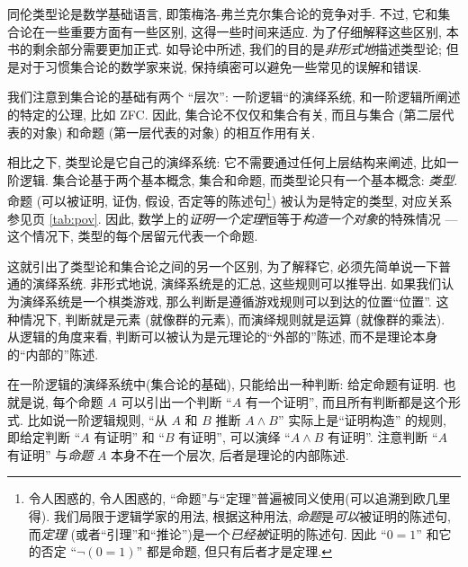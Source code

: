 \label{sec:axioms}

同伦类型论是数学基础语言, 即策梅洛-弗兰克尔集合论的竞争对手. 不过, 它和集合论在一些重要方面有一些区别, 这得一些时间来适应. 为了仔细解释这些区别, 本书的剩余部分需要更加正式. 如导论中所述, 我们的目的是\emph{非形式地}描述类型论; 但是对于习惯集合论的数学家来说, 保持缜密可以避免一些常见的误解和错误.

我们注意到集合论的基础有两个 ``层次'': 一阶逻辑``的演绎系统, 和一阶逻辑所阐述的特定的公理, 比如 ZFC. 因此, 集合论不仅仅和集合有关, 而且与集合 (第二层代表的对象) 和命题 (第一层代表的对象) 的相互作用有关.

相比之下, 类型论是它自己的演绎系统: 它不需要通过任何上层结构来阐述, 比如一阶逻辑. 集合论基于两个基本概念, 集合和命题, 而类型论只有一个基本概念: \emph{类型}. 命题 (可以被证明, 证伪, 假设, 否定等的陈述句\footnote{令人困惑的, 令人困惑的, ``命题''与``定理''普遍被同义使用(可以追溯到欧几里得). 我们局限于逻辑学家的用法, 根据这种用法, \emph{命题}是\emph{可以}被证明的陈述句, 而\emph{定理} (或者``引理''和``推论'')是一个\emph{已经被}证明的陈述句. 因此 ``$0=1$'' 和它的否定 ``$\neg(0=1)$'' 都是命题, 但只有后者才是定理.}) 被认为是特定的类型, 对应关系参见\pageref{tab:pov}页 \cref{tab:pov}. 因此, 数学上的\emph{证明一个定理}恒等于\emph{构造一个对象}的特殊情况 --- 这个情况下, 类型的每个居留元代表一个命题.

%
这就引出了类型论和集合论之间的另一个区别, 为了解释它, 必须先简单说一下普通的演绎系统. 非形式地说, 演绎系统是的汇总,%
这些规则可以推导出. %
如果我们认为演绎系统是一个棋类游戏, %
那么判断是遵循游戏规则可以到达的位置``位置''. 这种情况下, 判断就是元素 (就像群的元素), 而演绎规则就是运算 (就像群的乘法). 从逻辑的角度来看, 判断可以被认为是元理论的``外部的''陈述, 而不是理论本身的``内部的''陈述.

在一阶逻辑的演绎系统中(集合论的基础), 只能给出一种判断: 给定命题有证明. 也就是说, 每个命题 $A$ 可以引出一个判断 ``$A$ 有一个证明'', 而且所有判断都是这个形式. 比如说一阶逻辑规则, ``从 $A$ 和 $B$ 推断 $A\wedge B$'' 实际上是``证明构造'' 的规则, 即给定判断 ``$A$ 有证明'' 和 ``$B$ 有证明'', 可以演绎 ``$A\wedge B$ 有证明''. 注意判断 ``$A$ 有证明'' 与\emph{命题} $A$ 本身不在一个层次, 后者是理论的内部陈述. %


